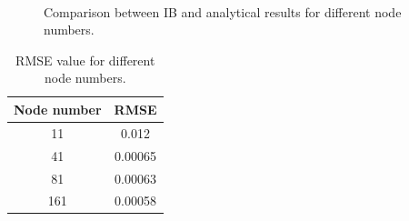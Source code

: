 \begin{figure}[H]
	\centering
	\quad
	\\
	\quad
	\caption{Comparison between IB and analytical results for different node numbers.}
	\label{fig:C3_virtualBoundaryResultNodeNumber}
\end{figure}

\begin{table}[H]
\centering
\begin{tabular}{c | c }
	 Node number & RMSE \\ \hline \hline
	 11 & 0.012 \\ \hline
	 41 & 0.00065 \\ \hline
	 81 & 0.00063 \\ \hline
	 161 & 0.00058 \\
\end{tabular}
\caption{RMSE value for different node numbers.}
\label{table:C3_virtualBoundaryResultNodeNumberRMSE}
\end{table}

